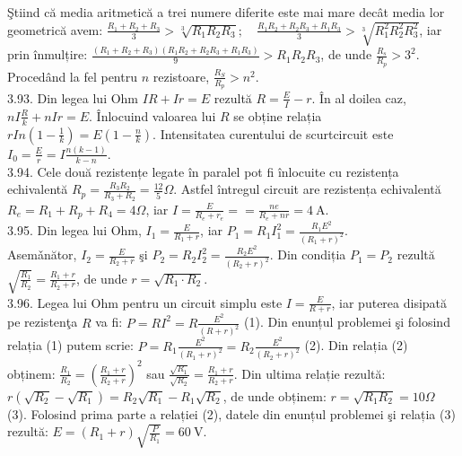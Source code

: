 Ştiind că media aritmetică a trei numere diferite este mai mare decât media lor geometrică avem: $\frac{R_{1}+R_{2}+R_{3}}{3}>\sqrt[3]{R_{1} R_{2} R_{3}} ; \quad \frac{R_{1} R_{2}+R_{2} R_{3}+R_{1} R_{3}}{3}>\sqrt[3]{R_{1}^{2} R_{2}^{2} R_{3}^{2}}$, iar prin înmulțire: $\frac{\left(R_{1}+R_{2}+R_{3}\right)\left(R_{1} R_{2}+R_{2} R_{3}+R_{1} R_{3}\right)}{9}>R_{1} R_{2} R_{3}$, de unde $\frac{R_{s}}{R_{p}}>3^{2}$. Procedând la fel pentru $n$ rezistoare, $\frac{R_{S}}{R_{p}}>n^{2}$.\\

3.93. Din legea lui Ohm $I R+I r=E$ rezultă $R=\frac{E}{I}-r$. În al doilea caz, $n I \frac{R}{k}+n I r=E$. Înlocuind valoarea lui $R$ se obține relația $r I n\left(1-\frac{1}{k}\right)=E\left(1-\frac{n}{k}\right)$. Intensitatea curentului de scurtcircuit este $I_{0}=\frac{E}{r}=I \frac{n(k-1)}{k-n}$.\\

3.94. Cele două rezistențe legate în paralel pot fi înlocuite cu rezistența echivalentă $R_{p}=\frac{R_{3} R_{2}}{R_{3}+R_{2}}=\frac{12}{5} \Omega$. Astfel întregul circuit are rezistența echivalentă $R_{e}=R_{1}+R_{p}+R_{4}=4 \Omega$, iar $I=\frac{E}{R_{e}+r_{e}}==\frac{n e}{R_{e}+n r}=4 \mathrm{~A}$.\\

3.95. Din legea lui Ohm, $I_{1}=\frac{E}{R_{1}+r}$, iar $P_{1}=R_{1} I_{1}^{2}=\frac{R_{1} E^{2}}{\left(R_{1}+r\right)^{2}}$.\\ Asemǎnător, $I_{2}=\frac{E}{R_{2}+r}$ şi $P_{2}=R_{2} I_{2}^{2}=\frac{R_{2} E^{2}}{\left(R_{2}+r\right)^{2}}$. Din condiția $P_{1}=P_{2}$ rezultă $\sqrt{\frac{R_{1}}{R_{2}}}=\frac{R_{1}+r}{R_{2}+r}$, de unde $r=\sqrt{R_{1} \cdot R_{2}}$.\\

3.96. Legea lui Ohm pentru un circuit simplu este $I=\frac{E}{R+r}$, iar puterea disipată pe rezistenţa $R$ va fi: $P=R I^{2}=R \frac{E^{2}}{(R+r)^{2}}$ (1). Din enunțul problemei şi folosind relația (1) putem scrie: $P=R_{1} \frac{E^{2}}{\left(R_{1}+r\right)^{2}}=R_{2} \frac{E^{2}}{\left(R_{2}+r\right)^{2}}$ (2). Din relația (2) obținem: $\frac{R_{1}}{R_{2}}=\left(\frac{R_{1}+r}{R_{2}+r}\right)^{2}$ sau $\frac{\sqrt{R_{1}}}{\sqrt{R_{2}}}=\frac{R_{1}+r}{R_{2}+r}$. Din ultima relație rezultă: $r\left(\sqrt{R_{2}}-\sqrt{R_{1}}\right)=R_{2} \sqrt{R_{1}}-R_{1} \sqrt{R_{2}}$, de unde obținem: $r=\sqrt{R_{1} R_{2}}=10 \Omega \quad$ (3). Folosind prima parte a relației (2), datele din enunțul problemei şi relația (3) rezultă: $E=\left(R_{1}+r\right) \sqrt{\frac{P}{R_{1}}}=60 \mathrm{~V}$.\\

